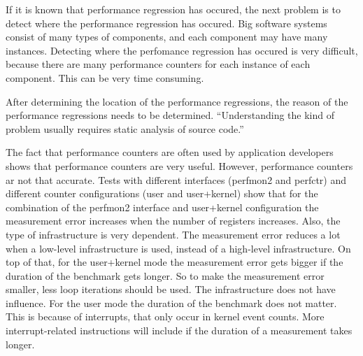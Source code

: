 If it is known that performance regression has occured, the next problem is to detect where the performance regression has occured. Big software systems consist of many types of components, and each component may have many instances. Detecting where the perfomance regression has occured is very difficult, because there are many performance counters for each instance of each component. This can be very time consuming.

After determining the location of the performance regressions, the reason of the performance regressions needs to be determined. ``Understanding the kind of problem usually requires static analysis of source code.'' \cite{nguyen2012using}

The fact that performance counters are often used by application developers shows that performance counters are very useful. However, performance counters ar not that accurate. Tests with different interfaces (perfmon2 and perfctr) and different counter configurations (user and user+kernel) show that for the combination of the perfmon2 interface and user+kernel configuration the measurement error increases when the number of registers increases. \cite{AccuracyPerformanceCounter}
Also, the type of infrastructure is very dependent. The measurement error reduces a lot when a low-level infrastructure is used, instead of a high-level infrastructure.
On top of that, for the user+kernel mode the measurement error gets bigger if the duration of the benchmark gets longer. \cite{AccuracyPerformanceCounter} So to make the measurement error smaller, less loop iterations should be used.  The infrastructure does not have influence. For the user mode the duration of the benchmark does not matter. This is because of interrupts, that only occur in kernel event counts. More interrupt-related instructions will include if the duration of a measurement takes longer.
